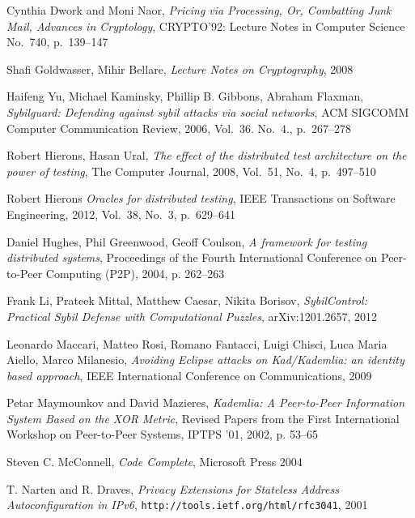 \begin{thebibliography}{99}
  Cynthia Dwork and Moni Naor,
  \textit{Pricing via Processing, Or, Combatting Junk Mail, Advances in
  Cryptology},
  CRYPTO’92: Lecture Notes in Computer Science No.~740,
  p.~139--147



  Shafi Goldwasser, Mihir Bellare,
  \textit{Lecture Notes on Cryptography},
  2008


Haifeng Yu, Michael Kaminsky, Phillip B. Gibbons, Abraham Flaxman,
\textit{Sybilguard: Defending against sybil attacks via social networks},
ACM SIGCOMM Computer Communication Review,
2006,
Vol.~36. No.~4., p.~267--278

  Robert Hierons, Hasan Ural,
  \textit{The effect of the distributed test architecture on the power of testing},
  The Computer Journal, 2008, Vol.~51, No.~4, p.~497--510

  Robert Hierons
  \textit{Oracles for distributed testing},
  IEEE Transactions on Software Engineering,
  2012, Vol.~38, No.~3, p.~629--641

  Daniel Hughes, Phil Greenwood, Geoff Coulson,
  \textit{A framework for testing distributed systems},
  Proceedings of the Fourth International Conference on Peer-to-Peer Computing
  (P2P), 
  2004, p. 262--263

Frank Li, Prateek Mittal, Matthew Caesar, Nikita Borisov,
\textit{SybilControl: Practical Sybil Defense with Computational Puzzles},
arXiv:1201.2657, 2012

  Leonardo Maccari, Matteo Rosi, Romano Fantacci, Luigi Chisci, Luca Maria
  Aiello, Marco Milanesio,
  \textit{Avoiding Eclipse attacks on Kad/Kademlia: an identity based approach},
   IEEE International Conference on Communications, 2009

  Petar Maymounkov and David Mazieres,
  \textit{Kademlia: A Peer-to-Peer Information System Based on the XOR Metric},
  Revised Papers from the First International Workshop on Peer-to-Peer Systems,
  IPTPS '01, 2002, p. 53--65

  Steven C. McConnell,
  \textit{Code Complete},
  Microsoft Press 2004

  T. Narten and R. Draves,
  \textit{Privacy Extensions for Stateless Address Autoconfiguration in IPv6},
  \texttt{http://tools.ietf.org/html/rfc3041},
  2001


\end{thebibliography}
